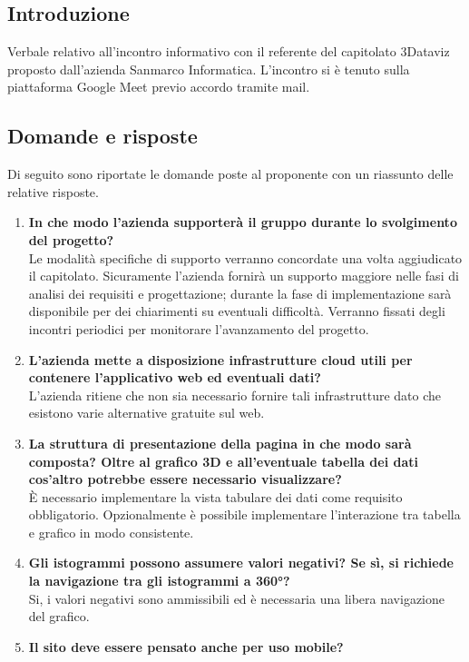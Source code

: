 \documentclass[10pt]{article}
\begin{document}
\subsection{Introduzione}
Verbale relativo all'incontro informativo con il referente del capitolato 3Dataviz proposto dall'azienda Sanmarco Informatica.
L'incontro si è tenuto sulla piattaforma Google Meet previo accordo tramite mail.

\subsection{Domande e risposte}
Di seguito sono riportate le domande poste al proponente con un riassunto delle relative risposte.
\begin{enumerate}
    \item \textbf{In che modo l'azienda supporterà il gruppo durante lo svolgimento del progetto?} \\
        Le modalità specifiche di supporto verranno concordate una volta aggiudicato il capitolato. 
        Sicuramente l'azienda fornirà un supporto maggiore nelle fasi di analisi dei requisiti e progettazione; durante la fase di implementazione sarà disponibile per dei chiarimenti su eventuali difficoltà. Verranno fissati degli incontri periodici per monitorare l'avanzamento del progetto.
    \item \textbf{L'azienda mette a disposizione infrastrutture cloud utili per contenere l'applicativo web ed eventuali dati?} \\
            L'azienda ritiene che non sia necessario fornire tali infrastrutture dato che esistono varie alternative gratuite sul web.
    \item \textbf{La struttura di presentazione della pagina in che modo sarà composta? Oltre al grafico 3D e all'eventuale tabella dei dati cos'altro potrebbe essere necessario visualizzare?}\\
        È necessario implementare la vista tabulare dei dati come requisito obbligatorio. Opzionalmente è possibile implementare l'interazione tra tabella e grafico in modo consistente.
    \item \textbf{Gli istogrammi possono assumere valori negativi? Se sì, si richiede la navigazione tra gli istogrammi a 360°? }\\
        Si, i valori negativi sono ammissibili ed è necessaria una libera navigazione del grafico.
    \item \textbf{Il sito deve essere pensato anche per uso mobile?} \\

\end{enumerate}
\end{document}
